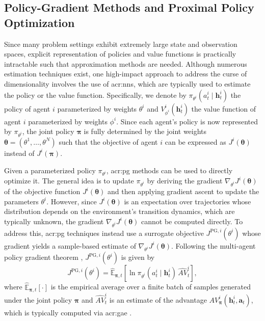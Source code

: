 \subsection{Policy-Gradient Methods and Proximal Policy Optimization}
\label{sec:pg-ppo}
Since many problem settings exhibit extremely large state and observation spaces, explicit representation of policies and value functions is practically intractable such that approximation methods are needed. Although  numerous estimation techniques exist, one high-impact approach to address the curse of dimensionality involves the use of \glspl{acr:nn}, which are typically used to estimate the policy or the value function. Specifically, we denote by $\pi_{\theta^i}(a^i_t \mid \mathbf{h}^i_t)$ the policy of agent $i$ parameterized by weights $\theta^i$ and $V^i_{\phi^i}(\mathbf{h}^i_t)$ the value function of agent $i$ parameterized by weights $\phi^i$. Since each agent's policy is now represented by $\pi_{\theta^i}$, the joint policy $\boldsymbol{\pi}$ is fully determined by the joint weights $\boldsymbol{\theta}=(\theta^1,\dots,\theta^N)$ such that the objective of agent $i$ can be expressed as $J^i(\boldsymbol{\theta})$ instead of $J^i(\boldsymbol{\pi})$.

Given a parameterized policy $\pi_{\theta^i}$, \gls{acr:pg} methods can be used to directly optimize it. The general idea is to update $\pi_{\theta^i}$ by deriving the gradient $\nabla_{\theta^i} J^i(\boldsymbol{\theta})$ of the objective function $J^i(\boldsymbol{\theta})$ and then applying gradient ascent to update the parameters $\theta^i$. However, since $J^i(\boldsymbol{\theta})$ is an expectation over trajectories whose distribution depends on the environment's transition dynamics, which are typically unknown, the gradient $\nabla_{\theta^i} J^i(\boldsymbol{\theta})$ cannot be computed directly. To address this, \gls{acr:pg} techniques instead use a surrogate objective $J^{\text{PG},i}(\theta^i)$ whose gradient yields a sample-based estimate of $\nabla_{\theta^i} J^i(\boldsymbol{\theta})$. Following the multi-agent policy gradient theorem \citep{Sutton1999, foerster2018counterfactual, kuba2022trust}, $J^{\text{PG},i}(\theta^i)$ is given by  
\begin{equation} 
\label{eq:mapg}
    J^{\text{PG},i}(\theta^i) = \hat{\mathbb{E}}_{\boldsymbol{\pi}, t}\!\left[ \ln \pi_{\theta^i}(a^i_t \mid \mathbf{h}^i_t)\, \widehat{AV}^i_t \right],
\end{equation}
where $\hat{\mathbb{E}}_{\boldsymbol{\pi}, t}[\cdot]$ is the empirical average over a finite batch of samples generated under the joint policy $\boldsymbol{\pi}$ and $\widehat{AV}^i_t$ is an estimate of the advantage $AV^i_{\boldsymbol{\pi}}(\mathbf{h}^i_t,\mathbf{a}_t)$, which is typically computed via \gls{acr:gae} \citep{Schulmanetal2015GAE}.

